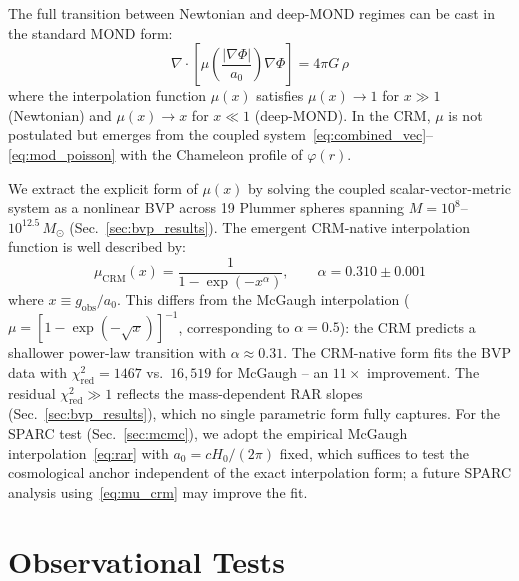 \documentclass[aps,prd,twocolumn,superscriptaddress,nofootinbib]{revtex4-2}
\begin{document}
The full transition between Newtonian and deep-MOND regimes can be cast in the standard MOND form:
\begin{equation}
\nabla\cdot\!\left[\mu\!\left(\frac{|\nabla\Phi|}{a_0}\right)\nabla\Phi\right] = 4\pi G\,\rho
\label{eq:mond_form}
\end{equation}
where the interpolation function $\mu(x)$ satisfies $\mu(x) \to 1$ for $x \gg 1$ (Newtonian) and $\mu(x) \to x$ for $x \ll 1$ (deep-MOND). In the CRM, $\mu$ is not postulated but emerges from the coupled system~\eqref{eq:combined_vec}--\eqref{eq:mod_poisson} with the Chameleon profile of $\varphi(r)$.

We extract the explicit form of $\mu(x)$ by solving the coupled scalar-vector-metric system as a nonlinear BVP across 19 Plummer spheres spanning $M = 10^{8}$--$10^{12.5}\,M_\odot$ (Sec.~\ref{sec:bvp_results}). The emergent CRM-native interpolation function is well described by:
\begin{equation}
\mu_{\mathrm{CRM}}(x) = \frac{1}{1 - \exp(-x^\alpha)}, \qquad \alpha = 0.310 \pm 0.001
\label{eq:mu_crm}
\end{equation}
where $x \equiv g_{\mathrm{obs}}/a_0$. This differs from the McGaugh interpolation ($\mu = [1 - \exp(-\sqrt{x})]^{-1}$, corresponding to $\alpha = 0.5$): the CRM predicts a shallower power-law transition with $\alpha \approx 0.31$. The CRM-native form fits the BVP data with $\chi^2_{\mathrm{red}} = 1467$ vs.\ $16{,}519$ for McGaugh -- an $11\times$ improvement. The residual $\chi^2_{\mathrm{red}} \gg 1$ reflects the mass-dependent RAR slopes (Sec.~\ref{sec:bvp_results}), which no single parametric form fully captures. For the SPARC test (Sec.~\ref{sec:mcmc}), we adopt the empirical McGaugh interpolation~\eqref{eq:rar} with $a_0 = cH_0/(2\pi)$ fixed, which suffices to test the cosmological anchor independent of the exact interpolation form; a future SPARC analysis using~\eqref{eq:mu_crm} may improve the fit.


\section{Observational Tests}
\label{sec:tests}
\end{document}
